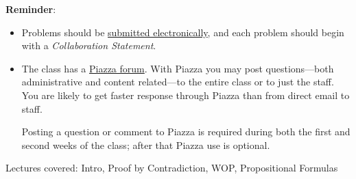 \documentclass[handout]{mcs}
\begin{document}
\renewcommand{\reading}{ \iffalse
  Part~\bref{part:proofs}{. \emph{Proofs: Introduction}};\fi
\begin{itemize}
\item Chapter~\bref{proofs_chap}{.\ \emph{What is a Proof?}},

\item  Chapter~\bref{well_ordering_chap}{.\ \emph{The Well Ordering
      Principle}}--\bref{factor_sec}{.\ \emph{Factoring into Primes}}
  (omit~\bref{well_ordering_sec}{.\ \emph{Well Ordered Sets}}),

\item  Chapter~\bref{logicform_chap}{.\ \emph{Logical
      Formulas}}--\bref{equiv_valid_sec}{.\ \emph{Equivalence and
      Validity}}, and~\bref{SAT_sec}{.\ \emph{The SAT Problem}}\\
  (optional:~\bref{prop_algebra_sec}{.\ \emph{Algebra of
      Propositions}}).
\end{itemize}
These assigned readings do \textbf{not}
  include the Problem sections.  (Many of the problems in the text
  will appear as class or homework problems.)}


\medskip

\textbf{Reminder}:

\begin{itemize}

\item Problems should be
  \href{https://stellar.mit.edu/S/course/6/sp14/6.042/courseMaterial/topics/topic2/syllabus/text3/text}
       {submitted electronically}, and each problem should begin with a \emph{Collaboration Statement}.
\iffalse
\href{http://courses.csail.mit.edu/6.042/spring14/submission.shtml#collab-state}
{\emph{collaboration statement}}
\fi

\item The class has a
  \href{http://piazza.com/mit/spring2014/6042j18062j/home} {Piazza
    forum}.  With Piazza you may post questions---both administrative
  and content related---to the entire class or to just the staff.  You
  are likely to get faster response through Piazza than from direct
  email to staff.

Posting a question or comment to Piazza is required during both the
first and second weeks of the class; after that Piazza use is
optional.
\end{itemize}

\begin{staffnotes}
Lectures covered: Intro, Proof by Contradiction, WOP, Propositional Formulas
\end{staffnotes}
\end{document}
